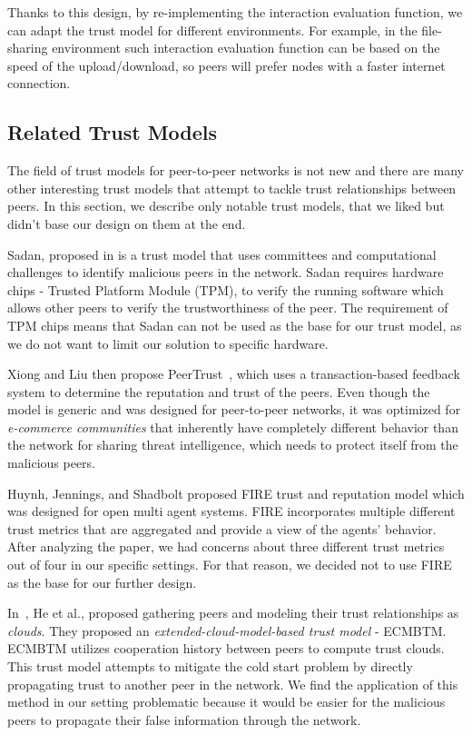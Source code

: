 Thanks to this design, by re-implementing the interaction evaluation function, we can adapt the trust model for different environments.
For example, in the file-sharing environment such interaction evaluation function can be based on the speed of the upload/download, so peers will prefer nodes with a faster internet connection.


\subsection{Related Trust Models}
\label{subsec:related-trust-models}
The field of trust models for peer-to-peer networks is not new and there are many other interesting trust models that attempt to tackle trust relationships between peers.
In this section, we describe only notable trust models, that we liked but didn't base our design on them at the end.

Sadan, proposed in \cite{abera2019sadan} is a trust model that uses committees and computational challenges to identify malicious peers in the network.
Sadan requires hardware chips - Trusted Platform Module (TPM), to verify the running software which allows other peers to verify the trustworthiness of the peer.
The requirement of TPM chips means that Sadan can not be used as the base for our trust model, as we do not want to limit our solution to specific hardware.

Xiong and Liu then propose PeerTrust~\cite{xiong2004peertrust}, which uses a transaction-based feedback system to determine the reputation and trust of the peers.
Even though the model is generic and was designed for peer-to-peer networks, it was optimized for \textit{e-commerce communities} that inherently have completely different behavior than the network for sharing threat intelligence, which needs to protect itself from the malicious peers.

Huynh, Jennings, and Shadbolt proposed FIRE trust and reputation model \cite{huynh2006integrated} which was designed for open multi agent systems.
FIRE incorporates multiple different trust metrics that are aggregated and provide a view of the agents' behavior.
After analyzing the paper, we had concerns about three different trust metrics out of four in our specific settings.
For that reason, we decided not to use FIRE as the base for our further design.

In~\cite{1562680}, He et al., proposed gathering peers and modeling their trust relationships as \textit{clouds}. They proposed an \textit{extended-cloud-model-based trust model} - ECMBTM.
ECMBTM utilizes cooperation history between peers to compute trust clouds. 
This trust model attempts to mitigate the cold start problem by directly propagating trust to another peer in the network.
We find the application of this method in our setting problematic because it would be easier for the malicious peers to propagate their false information through the network.

